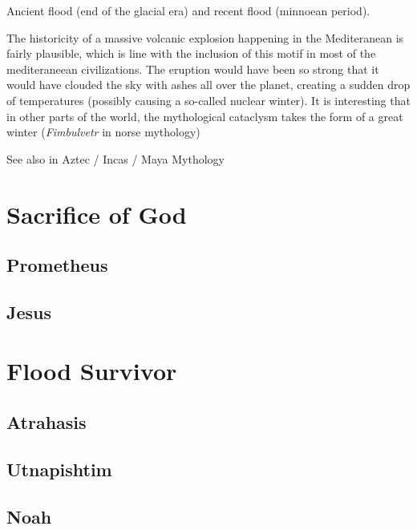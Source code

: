 \documentclass[
]{book}
\begin{document}
Ancient flood (end of the glacial era) and recent flood (minnoean period).

The historicity of a massive volcanic explosion happening in the Mediteranean is fairly plausible, which is line with the inclusion of this motif in most of the mediteraneean civilizations. The eruption would have been so strong that it would have clouded the sky with ashes all over the planet, creating a sudden drop of temperatures (possibly causing a so-called nuclear winter). It is interesting that in other parts of the world, the mythological cataclysm takes the form of a great winter (\emph{Fimbulvetr} in norse mythology)

See also in Aztec / Incas / Maya Mythology

\hypertarget{sacrifice-of-god}{%
\section{Sacrifice of God}\label{sacrifice-of-god}}

\hypertarget{prometheus}{%
\subsection{Prometheus}\label{prometheus}}

\hypertarget{jesus}{%
\subsection{Jesus}\label{jesus}}

\hypertarget{flood-survivor}{%
\section{Flood Survivor}\label{flood-survivor}}

\hypertarget{atrahasis}{%
\subsection{Atrahasis}\label{atrahasis}}

\hypertarget{utnapishtim}{%
\subsection{Utnapishtim}\label{utnapishtim}}

\hypertarget{noah}{%
\subsection{Noah}\label{noah}}
\end{document}
